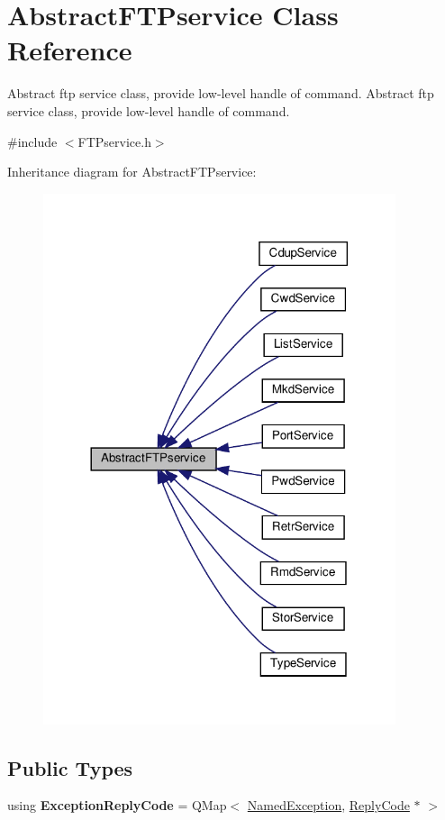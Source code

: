 \hypertarget{classAbstractFTPservice}{}\section{Abstract\+F\+T\+Pservice Class Reference}
\label{classAbstractFTPservice}


Abstract ftp service class, provide low-\/level handle of command.  Abstract ftp service class, provide low-\/level handle of command.  




{\ttfamily \#include $<$F\+T\+Pservice.\+h$>$}



Inheritance diagram for Abstract\+F\+T\+Pservice\+:\nopagebreak
\begin{figure}[H]
\begin{center}
\leavevmode
\includegraphics[width=293pt]{d2/d55/classAbstractFTPservice__inherit__graph}
\end{center}
\end{figure}
\subsection*{Public Types}
\begin{DoxyCompactItemize}
\item 
\mbox{\label{classAbstractFTPservice_a9ded9b5067150f1d98ad0d40e489f5d3}} 
using {\bfseries Exception\+Reply\+Code} = Q\+Map$<$ \hyperlink{classNamedException}{Named\+Exception}, \hyperlink{classReplyCode}{Reply\+Code} $\ast$ $>$
\end{DoxyCompactItemize}
